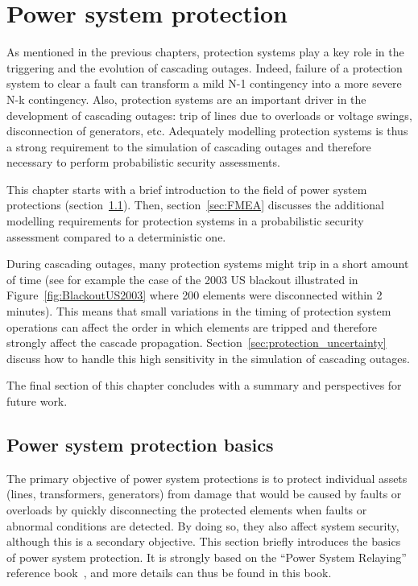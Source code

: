 \chapter{Power system protection}
\label{ch:protections}
\minitoc


As mentioned in the previous chapters, protection systems play a key role in the triggering and the evolution of cascading outages. Indeed, failure of a protection system to clear a fault can transform a mild N-1 contingency into a more severe N-k contingency. Also, protection systems are an important driver in the development of cascading outages: trip of lines due to overloads or voltage swings, disconnection of generators, etc. Adequately modelling protection systems is thus a strong requirement to the simulation of cascading outages and therefore necessary to perform probabilistic security assessments.

This chapter starts with a brief introduction to the field of power system protections (section~\ref{sec:protection_basics}). Then, section~\ref{sec:FMEA} discusses the additional modelling requirements for protection systems in a probabilistic security assessment compared to a deterministic one.

During cascading outages, many protection systems might trip in a short amount of time (see for example the case of the 2003 US blackout illustrated in Figure~\ref{fig:BlackoutUS2003} where 200 elements were disconnected within 2 minutes). This means that small variations in the timing of protection system operations can affect the order in which elements are tripped and therefore strongly affect the cascade propagation. Section~\ref{sec:protection_uncertainty} discuss how to handle this high sensitivity in the simulation of cascading outages.

The final section of this chapter concludes with a summary and perspectives for future work.


\section{Power system protection basics}
\label{sec:protection_basics}

The primary objective of power system protections is to protect individual assets (lines, transformers, generators) from damage that would be caused by faults or overloads by quickly disconnecting the protected elements when faults or abnormal conditions are detected. By doing so, they also affect system security, although this is a secondary objective. This section briefly introduces the basics of power system protection. It is strongly based on the ``Power System Relaying'' reference book~\cite{HorowitzBook}, and more details can thus be found in this book.

